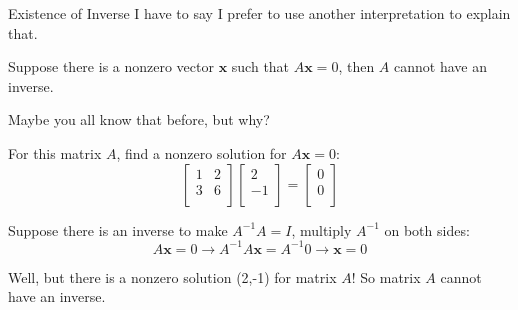 \documentclass{beamer}
\begin{document}
\begin{frame}{Existence of Inverse}
I have to say I prefer to use another interpretation to explain that.

\begin{theorem}
Suppose there is a nonzero vector $\mathbf{x}$ such that $A\mathbf{x}=0$, then $A$ cannot have an inverse.
\end{theorem}

Maybe you all know that before, but why?

For this matrix $A$, find a nonzero solution for $A\mathbf{x}=0$:
\begin{equation*}
    \left[ \begin{matrix}
        1&		2\\
        3&		6\\
    \end{matrix} \right] \left[ \begin{array}{c}
        2\\
        -1\\
    \end{array} \right] =\left[ \begin{array}{c}
        0\\
        0\\
    \end{array} \right]
\end{equation*}

Suppose there is an inverse to make $A^{-1}A=I$, multiply $A^{-1}$ on both sides:
\begin{equation*}
    A\mathbf{x}=0\rightarrow A^{-1}A\mathbf{x}=A^{-1}0\rightarrow \mathbf{x}=0
\end{equation*}

Well, but there is a nonzero solution (2,-1) for matrix $A$! So matrix $A$ cannot have an inverse.
\end{frame}
\end{document}
